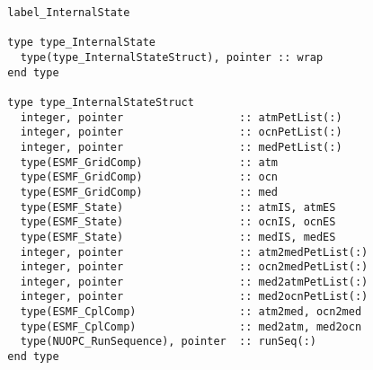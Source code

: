 \begin{verbatim}  label_InternalState

  type type_InternalState
    type(type_InternalStateStruct), pointer :: wrap
  end type

  type type_InternalStateStruct
    integer, pointer                  :: atmPetList(:)
    integer, pointer                  :: ocnPetList(:)
    integer, pointer                  :: medPetList(:)
    type(ESMF_GridComp)               :: atm
    type(ESMF_GridComp)               :: ocn
    type(ESMF_GridComp)               :: med
    type(ESMF_State)                  :: atmIS, atmES
    type(ESMF_State)                  :: ocnIS, ocnES
    type(ESMF_State)                  :: medIS, medES
    integer, pointer                  :: atm2medPetList(:)
    integer, pointer                  :: ocn2medPetList(:)
    integer, pointer                  :: med2atmPetList(:)
    integer, pointer                  :: med2ocnPetList(:)
    type(ESMF_CplComp)                :: atm2med, ocn2med
    type(ESMF_CplComp)                :: med2atm, med2ocn
    type(NUOPC_RunSequence), pointer  :: runSeq(:)
  end type

\end{verbatim}

